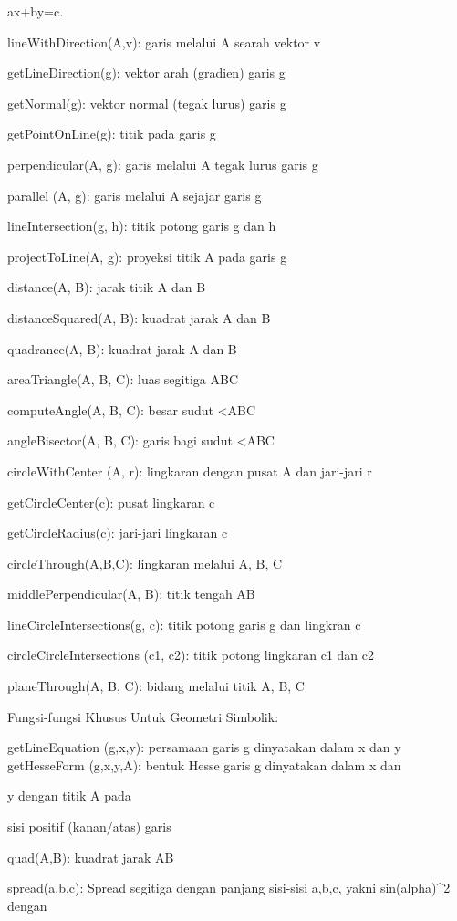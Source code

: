 \documentclass[
]{book}
\begin{document}
ax+by=c.

lineWithDirection(A,v): garis melalui A searah vektor v

getLineDirection(g): vektor arah (gradien) garis g

getNormal(g): vektor normal (tegak lurus) garis g

getPointOnLine(g): titik pada garis g

perpendicular(A, g): garis melalui A tegak lurus garis g

parallel (A, g): garis melalui A sejajar garis g

lineIntersection(g, h): titik potong garis g dan h

projectToLine(A, g): proyeksi titik A pada garis g

distance(A, B): jarak titik A dan B

distanceSquared(A, B): kuadrat jarak A dan B

quadrance(A, B): kuadrat jarak A dan B

areaTriangle(A, B, C): luas segitiga ABC

computeAngle(A, B, C): besar sudut \textless ABC

angleBisector(A, B, C): garis bagi sudut \textless ABC

circleWithCenter (A, r): lingkaran dengan pusat A dan jari-jari r

getCircleCenter(c): pusat lingkaran c

getCircleRadius(c): jari-jari lingkaran c

circleThrough(A,B,C): lingkaran melalui A, B, C

middlePerpendicular(A, B): titik tengah AB

lineCircleIntersections(g, c): titik potong garis g dan lingkran c

circleCircleIntersections (c1, c2): titik potong lingkaran c1 dan c2

planeThrough(A, B, C): bidang melalui titik A, B, C

Fungsi-fungsi Khusus Untuk Geometri Simbolik:

getLineEquation (g,x,y): persamaan garis g dinyatakan dalam x dan y\\
getHesseForm (g,x,y,A): bentuk Hesse garis g dinyatakan dalam x dan

y dengan titik A pada

sisi positif (kanan/atas) garis

quad(A,B): kuadrat jarak AB

spread(a,b,c): Spread segitiga dengan panjang sisi-sisi a,b,c, yakni sin(alpha)\^{}2 dengan
\end{document}
